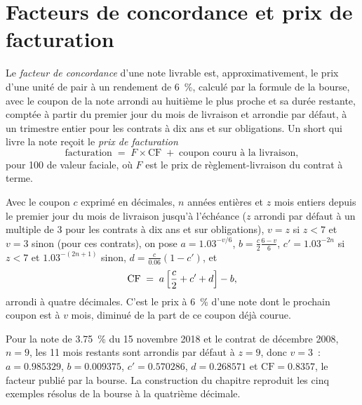 \section{Facteurs de concordance et prix de facturation}

\begin{definition}\label{def:m2:bond-futures:cf}
Le \emph{facteur de concordance} d'une note livrable
est, approximativement, le prix d'une unité de pair à un rendement de 6~\%, calculé par
la formule de la bourse, avec le coupon de la note arrondi au huitième le plus proche
et sa durée restante, comptée à partir du premier jour du mois de livraison et arrondie par défaut,
à un trimestre entier pour les contrats à dix ans et sur obligations. Un short qui livre
la note reçoit le \emph{prix de facturation}
\[
\text{facturation} \;=\; F \times \mathrm{CF} \;+\; \text{coupon couru à la livraison},
\]
pour 100 de valeur faciale, où $F$ est le prix de règlement-livraison du contrat à terme.
\end{definition}

\begin{method}\label{met:m2:bond-futures:cf}
Avec le coupon $c$ exprimé en décimales, $n$ années entières et $z$ mois entiers depuis le
premier jour du mois de livraison jusqu'à l'échéance ($z$ arrondi par défaut à un multiple de
3 pour les contrats à dix ans et sur obligations), $v = z$ si $z < 7$ et $v = 3$
sinon (pour ces contrats), on pose $a = 1.03^{-v/6}$, $b = \frac c2
\frac{6 - v}{6}$, $c' = 1.03^{-2n}$ si $z < 7$ et $1.03^{-(2n+1)}$ sinon,
$d = \frac{c}{0.06}(1 - c')$, et
\[
\mathrm{CF} \;=\; a\,\Bigl[\frac c2 + c' + d\Bigr] - b,
\]
arrondi à quatre décimales. C'est le prix à 6~\% d'une note dont le prochain coupon
est à $v$ mois, diminué de la part de ce coupon déjà courue.
\end{method}

\begin{example}\label{ex:m2:bond-futures:cf}
Pour la note de 3.75~\% du 15 novembre 2018 et le contrat de décembre 2008,
$n = 9$, les 11 mois restants sont arrondis par défaut à $z = 9$, donc $v =
3$~: $a = 0.985329$, $b = 0.009375$, $c' = 0.570286$, $d = 0.268571$ et
$\mathrm{CF} = 0.8357$, le facteur publié par la bourse. La construction
du chapitre reproduit les cinq exemples résolus de la bourse à la quatrième décimale.
\end{example}

